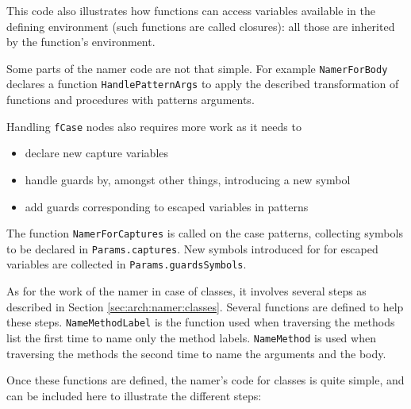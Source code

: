 \documentclass[a4paper]{memoir}
\begin{document}
This code also illustrates how functions can access variables
available in the defining environment (such functions are called closures): all
those are inherited by the function's environment.

Some parts of the namer code are not that simple. For example \lstinline!NamerForBody! 
declares a function \lstinline!HandlePatternArgs!
to apply the described transformation of functions and procedures with patterns
arguments. 

Handling \lstinline!fCase! nodes also requires more work as it needs to 
\begin{itemize}
  \item declare new capture variables
  \item handle guards by, amongst other things, introducing a new symbol
  \item add guards corresponding to escaped variables in patterns
\end{itemize}
The function \lstinline!NamerForCaptures! is called on the case patterns, collecting symbols
to be declared in \lstinline!Params.captures!.
New symbols introduced for for escaped variables are collected in
\lstinline!Params.guardsSymbols!. 

As for the work of the namer in case of classes, it involves several steps as described
in Section \ref{sec:arch:namer:classes}.
Several functions are defined to help these steps. \lstinline!NameMethodLabel!
is the function used when traversing the methods list the first time to name
only the method labels.
\lstinline!NameMethod! is used when traversing the methods the second time to
name the arguments and the body.

Once these functions are defined, the namer's code for classes is quite simple,
and can be included here to illustrate the different steps:
\end{document}
